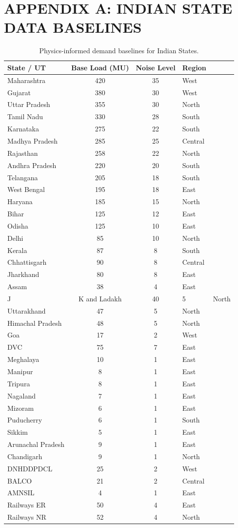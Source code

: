 \documentclass[12pt,a4paper,twoside,fleqn]{report}
\begin{document}
\chapter{APPENDIX A: INDIAN STATE DATA BASELINES}
\begin{table}[H]
\centering
\begin{tabularx}{\textwidth}{|X|c|c|l|}
\hline
\textbf{State / UT} & \textbf{Base Load (MU)} & \textbf{Noise Level} & \textbf{Region} \\
\hline
Maharashtra & 420 & 35 & West \\
Gujarat & 380 & 30 & West \\
Uttar Pradesh & 355 & 30 & North \\
Tamil Nadu & 330 & 28 & South \\
Karnataka & 275 & 22 & South \\
Madhya Pradesh & 285 & 25 & Central \\
Rajasthan & 258 & 22 & North \\
Andhra Pradesh & 220 & 20 & South \\
Telangana & 205 & 18 & South \\
West Bengal & 195 & 18 & East \\
Haryana & 185 & 15 & North \\
Bihar & 125 & 12 & East \\
Odisha & 125 & 10 & East \\
Delhi & 85 & 10 & North \\
Kerala & 87 & 8 & South \\
Chhattisgarh & 90 & 8 & Central \\
Jharkhand & 80 & 8 & East \\
Assam & 38 & 4 & East \\
J&K and Ladakh & 40 & 5 & North \\
Uttarakhand & 47 & 5 & North \\
Himachal Pradesh & 48 & 5 & North \\
Goa & 17 & 2 & West \\
DVC & 75 & 7 & East \\
Meghalaya & 10 & 1 & East \\
Manipur & 8 & 1 & East \\
Tripura & 8 & 1 & East \\
Nagaland & 7 & 1 & East \\
Mizoram & 6 & 1 & East \\
Puducherry & 6 & 1 & South \\
Sikkim & 5 & 1 & East \\
Arunachal Pradesh & 9 & 1 & East \\
Chandigarh & 9 & 1 & North \\
DNHDDPDCL & 25 & 2 & West \\
BALCO & 21 & 2 & Central \\
AMNSIL & 4 & 1 & East \\
Railways ER & 50 & 4 & East \\
Railways NR & 52 & 4 & North \\
\hline
\end{tabularx}
\caption{Physics-informed demand baselines for Indian States.}
\end{table}
\end{document}
